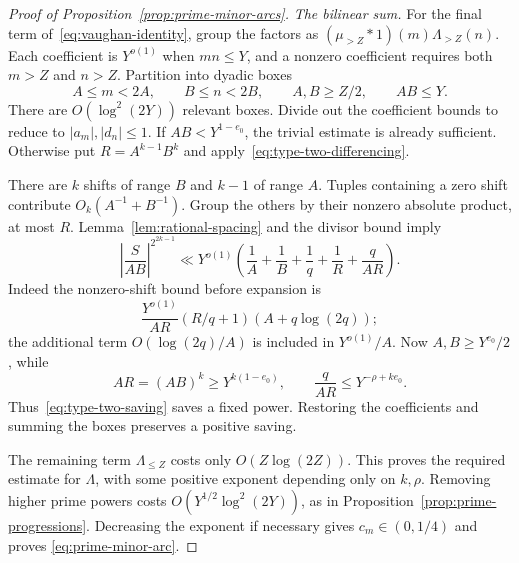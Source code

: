\begin{proof}[Proof of Proposition~\ref{prop:prime-minor-arcs}]
\emph{The bilinear sum.}
For the final term of~\eqref{eq:vaughan-identity}, group the factors as
$(\mu_{>Z}*1)(m)\Lambda_{>Z}(n)$.  Each coefficient is $Y^{o(1)}$
when $mn\le Y$, and a nonzero coefficient requires both $m>Z$ and
$n>Z$.  Partition into dyadic boxes
\[
 A\le m<2A,\qquad B\le n<2B,
 \qquad A,B\ge Z/2,\qquad AB\le Y.
\]
There are $O(\log^2(2Y))$ relevant boxes.  Divide out the coefficient
bounds to reduce to $|a_m|,|d_n|\le1$.  If $AB<Y^{1-e_0}$,
the trivial estimate is already sufficient.  Otherwise put
$R=A^{k-1}B^k$ and apply~\eqref{eq:type-two-differencing}.

There are $k$ shifts of range $B$ and $k-1$ of range $A$.
Tuples containing a zero shift contribute
$O_k(A^{-1}+B^{-1})$.  Group the others by their nonzero absolute
product, at most $R$.  Lemma~\ref{lem:rational-spacing} and the divisor
bound imply
\begin{equation}\label{eq:type-two-saving}
 \left|\frac{S}{AB}\right|^{2^{2k-1}}
 \ll Y^{o(1)}\left(
 \frac1A+\frac1B+\frac1q+\frac1R+\frac q{AR}\right).
\end{equation}
Indeed the nonzero-shift bound before expansion is
\[
 \frac{Y^{o(1)}}{AR}(R/q+1)(A+q\log(2q));
\]
the additional term $O(\log(2q)/A)$ is included in $Y^{o(1)}/A$.
Now $A,B\ge Y^{e_0}/2$, while
\[
 AR=(AB)^k\ge Y^{k(1-e_0)},\qquad
 \frac q{AR}\le Y^{-\rho+ke_0}.
\]
Thus~\eqref{eq:type-two-saving} saves a fixed power.  Restoring the
coefficients and summing the boxes preserves a positive saving.

The remaining term $\Lambda_{\le Z}$ costs only $O(Z\log(2Z))$.
This proves the required estimate for $\Lambda$, with some positive
exponent depending only on $k,\rho$.  Removing higher prime powers
costs $O(Y^{1/2}\log^2(2Y))$, as in
Proposition~\ref{prop:prime-progressions}.  Decreasing the exponent
if necessary gives $c_m\in(0,1/4)$ and proves
\eqref{eq:prime-minor-arc}.
\end{proof}
